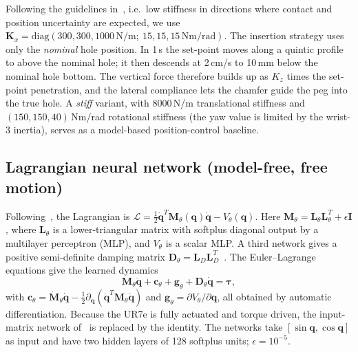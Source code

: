 \documentclass[conference]{IEEEtran}
\newcommand{\bq}{\boldsymbol{q}}
\newcommand{\dq}{\dot{\boldsymbol{q}}}
\newcommand{\ddq}{\ddot{\boldsymbol{q}}}
\newcommand{\btau}{\boldsymbol{\tau}}
\newcommand{\bM}{\boldsymbol{M}}
\newcommand{\bK}{\boldsymbol{K}}
\newcommand{\bD}{\boldsymbol{D}}
\newcommand{\bc}{\boldsymbol{c}}
\newcommand{\bg}{\boldsymbol{g}}
\begin{document}
Following the guidelines in~\cite{carloni2026}, i.e.\ low stiffness in directions where contact and position uncertainty are expected, we use $\bK_x=\mathrm{diag}(300,300,1000\,\mathrm{N/m};\ 15,15,15\,\mathrm{Nm/rad})$. The insertion strategy uses only the \emph{nominal} hole position. In 1\,s the set-point moves along a quintic profile to above the nominal hole; it then descends at 2\,cm/s to 10\,mm below the nominal hole bottom. The vertical force therefore builds up as $K_z$ times the set-point penetration, and the lateral compliance lets the chamfer guide the peg into the true hole. A \emph{stiff} variant, with $8000$\,N/m translational stiffness and $(150,150,40)$\,Nm/rad rotational stiffness (the yaw value is limited by the wrist-3 inertia), serves as a model-based position-control baseline.

\subsection{Lagrangian neural network (model-free, free motion)}
Following~\cite{lutter2019delan,lutter2023,liu2024}, the Lagrangian is $\mathcal{L}=\frac12\dq^T\bM_\theta(\bq)\dq-V_\theta(\bq)$. Here $\bM_\theta=\boldsymbol{L}_\theta\boldsymbol{L}_\theta^T+\epsilon\boldsymbol{I}$, where $\boldsymbol{L}_\theta$ is a lower-triangular matrix with softplus diagonal output by a multilayer perceptron (MLP), and $V_\theta$ is a scalar MLP. A third network gives a positive semi-definite damping matrix $\bD_\theta=\boldsymbol{L}_D\boldsymbol{L}_D^T$~\cite{liu2024}. The Euler--Lagrange equations give the learned dynamics
\begin{equation}
\bM_\theta\ddq + \bc_\theta + \bg_\theta + \bD_\theta\dq = \btau,
\label{eq:lnn}
\end{equation}
with $\bc_\theta=\dot{\bM}_\theta\dq-\frac12\partial_{\bq}(\dq^T\bM_\theta\dq)$ and $\bg_\theta=\partial V_\theta/\partial\bq$, all obtained by automatic differentiation. Because the UR7e is fully actuated and torque driven, the input-matrix network of~\cite{liu2024} is replaced by the identity. The networks take $[\sin\bq,\cos\bq]$ as input and have two hidden layers of 128 softplus units; $\epsilon=10^{-5}$.
\end{document}
